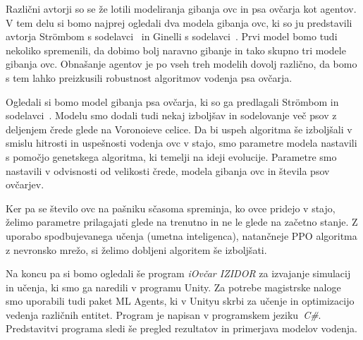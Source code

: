 Različni avtorji so se že lotili modeliranja gibanja ovc in psa ovčarja kot agentov. V tem delu si bomo najprej ogledali dva modela gibanja ovc, ki so ju predstavili avtorja Str{\"o}mbom s sodelavci~\cite{Stroembom} in Ginelli s sodelavci~\cite{Ginelli}. Prvi model bomo tudi nekoliko spremenili, da dobimo bolj naravno gibanje in tako skupno tri modele gibanja ovc. Obnašanje agentov je po vseh treh modelih dovolj različno, da bomo s tem lahko preizkusili robustnost algoritmov vodenja psa ovčarja.

Ogledali si bomo model gibanja psa ovčarja, ki so ga predlagali Str{\"o}mbom in sodelavci~\cite{Stroembom}. Modelu smo dodali tudi nekaj izboljšav in sodelovanje več psov z deljenjem črede glede na Voronoieve celice. Da bi uspeh algoritma še izboljšali v smislu hitrosti in uspešnosti vodenja ovc v stajo, smo parametre modela nastavili s pomočjo genetskega algoritma, ki temelji na ideji evolucije. Parametre smo nastavili v odvisnosti od velikosti črede, modela gibanja ovc in števila psov ovčarjev.

Ker pa se število ovc na pašniku sčasoma spreminja, ko ovce pridejo v stajo, želimo parametre prilagajati glede na trenutno in ne le glede na začetno stanje. Z uporabo spodbujevanega učenja (umetna inteligenca), natančneje PPO algoritma z nevronsko mrežo, si želimo dobljeni algoritem še izboljšati.

Na koncu pa si bomo ogledali še program \textit{iOvčar IZIDOR} za izvajanje simulacij in učenja, ki smo ga naredili v programu Unity. Za potrebe magistrske naloge smo uporabili tudi paket ML Agents, ki v Unityu skrbi za učenje in optimizacijo vedenja različnih entitet. Program je napisan v programskem jeziku~\textit{C\#}. Predstavitvi programa sledi še pregled rezultatov in primerjava modelov vodenja.
